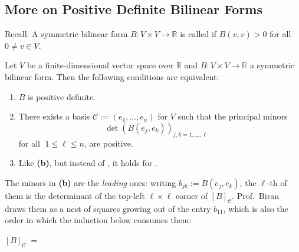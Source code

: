\subsection{More on Positive Definite Bilinear Forms}

Recall: A symmetric bilinear form $B \colon V \times V \to \mathbb{R}$ is called  if $B(v, v) > 0$ for all $0 \neq v \in V$.

\begin{theorem}
\label{thm:sylvesters_criterion}
Let $V$ be a finite-di\-men\-sional vector space over $\mathbb{R}$ and $B \colon V \times V \to \mathbb{R}$ a symmetric bilinear form. Then the following conditions are equivalent:
\begin{enumerate}[label=\textbf{(\alph*)}]
    \item $B$ is positive definite.
    \item There exists a basis $\mathcal{C} := (e_1, \dots, e_n)$ for $V$ such that the principal minors 
    \[ 
    \det(B(e_j, e_k))_{j,k=1, \dots, \ell} \quad 
    \]
    for all $\; 1 \le \ell \le n$, are positive.
    \item Like \textbf{(b)}, but instead of , it holds for .
\end{enumerate}
\end{theorem}

The minors in \textbf{(b)} are the \emph{leading} ones: writing $b_{jk} := B(e_j, e_k)$, the $\ell$-th of them is the determinant of the top-left $\ell \times \ell$ corner of $[B]_{\mathcal{C}}$. Prof.~Biran draws them as a nest of squares growing out of the entry $b_{11}$, which is also the order in which the induction below consumes them:

\begin{center}
$[B]_{\mathcal{C}} \;=\;$
\end{center}

